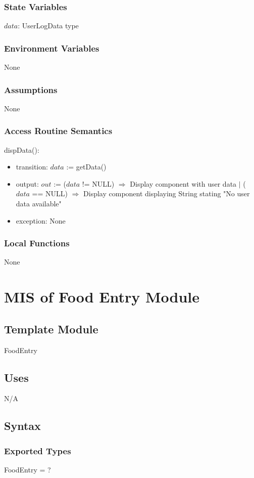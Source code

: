 \documentclass[12pt, titlepage]{article}
\begin{document}
\subsubsection{State Variables}
$data$: UserLogData type
\subsubsection{Environment Variables}
None
\subsubsection{Assumptions}
None
\subsubsection{Access Routine Semantics}
\noindent dispData():
\begin{itemize}
	\item transition: $data$ := getData()
	\item output: $out$ := ($data$ != NULL) $\Rightarrow$ Display component with user data $|$ ($data$ == NULL) $\Rightarrow$ Display component displaying String stating "No user data available"
	\item exception: None
\end{itemize}
\subsubsection{Local Functions}
None

\newpage

\section{MIS of Food Entry Module} \label{FoodEntry}
\subsection{Template Module}
FoodEntry
\subsection{Uses}
N/A
\subsection{Syntax}
\subsubsection{Exported Types}
FoodEntry = ?
\end{document}
